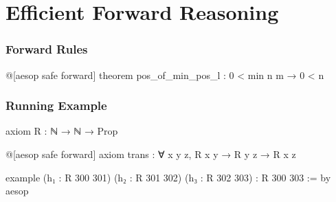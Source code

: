 \section{Efficient Forward Reasoning}

\begin{frame}[fragile]
  \frametitle{Forward Rules}

  \begin{leancode}
    @[aesop safe forward]
    theorem pos_of_min_pos_l : 0 < min n m → 0 < n
  \end{leancode}

  \begin{tcolorbox}
    \begin{center}
    \end{center}
  \end{tcolorbox}
\end{frame}

\begin{frame}[fragile]
  \frametitle{Running Example}

  \begin{leancode}
    axiom R : ℕ → ℕ → Prop

    @[aesop safe forward]
    axiom trans : ∀ x y z, R x y → R y z → R x z

    example
        (h₁ : R 300 301)
        (h₂ : R 301 302)
        (h₃ : R 302 303) :
        R 300 303 := by
      aesop
  \end{leancode}
\end{frame}

